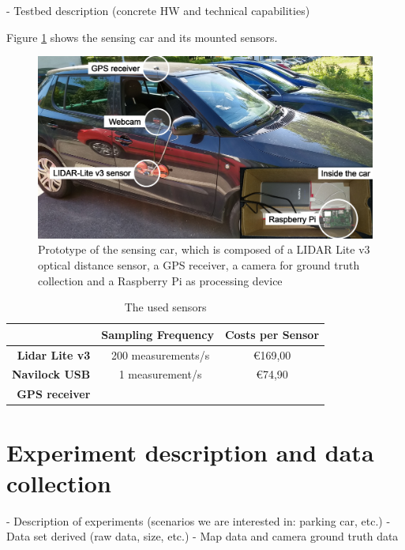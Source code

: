 - Testbed description (concrete HW and technical capabilities)

Figure \ref{fig:sensing_car} shows the sensing car and its mounted sensors. 

\begin{figure}
	\centering
	\includegraphics[width=\textwidth]{img/car.jpg}
	\caption{Prototype of the sensing car, which is composed of a LIDAR Lite v3 optical distance sensor, a GPS receiver, a camera for ground truth collection and a Raspberry Pi as processing device}
	\label{fig:sensing_car}
\end{figure}



\begin{table}

\bgroup
\def\arraystretch{1.5}
\begin{tabular}{| r || c | c |}
\hline
   & 
   \textbf{Sampling Frequency} & 
   \textbf{Costs per Sensor} \\
\hline
  \textbf{Lidar Lite v3} & 
   ~200 measurements/s &
   \euro{169,00} \\
\hline
  \textbf{Navilock USB} & 
   ~1 measurement/s &
   \euro{74,90} \\
   \textbf{GPS receiver} & & \\
\hline

\end{tabular}
\egroup

\caption{The used sensors}
\label{table:sensors_capabilities}
\end{table}


\section{Experiment description and data collection}
\label{sec:experiment_description_data_collection}
- Description of experiments (scenarios we are interested in: parking car, etc.)
- Data set derived (raw data, size, etc.)
- Map data and camera ground truth data


